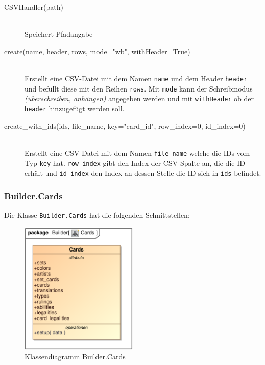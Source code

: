 \begin{description}
    \item[CSVHandler(path)] \hfill \\
    Speichert Pfadangabe
    
    \item[create(name, header, rows, mode="wb", withHeader=True)] \hfill \\
    Erstellt eine \ac{CSV}-Datei mit dem Namen \verb|name| und dem Header \verb|header| und befüllt diese mit den Reihen \verb|rows|. Mit \verb|mode| kann der Schreibmodus \emph{(überschreiben, anhängen)} angegeben werden und mit \verb|withHeader| ob der \verb|header| hinzugefügt werden soll.
    
    \item[create\_with\_ids(ids, file\_name, key="card\_id", row\_index=0, id\_index=0)] \hfill \\
    Erstellt eine \ac{CSV}-Datei mit dem Namen \verb|file_name| welche die IDs vom Typ \verb|key| hat. \verb|row_index| gibt den Index der CSV Spalte an, die die ID erhält und \verb|id_index| den Index an dessen Stelle die ID sich in \verb|ids| befindet.
\end{description}

\subsubsection{Builder.Cards}
Die Klasse \verb|Builder.Cards| hat die folgenden Schnittstellen:

\begin{figure}[H]
    \myfloatalign
    \includegraphics[width=0.5\textwidth]{gfx/MtGDeepAnalysis/Cards.eps}
    \caption{Klassendiagramm Builder.Cards}
    \label{fig:class:builder.cards}
\end{figure}

